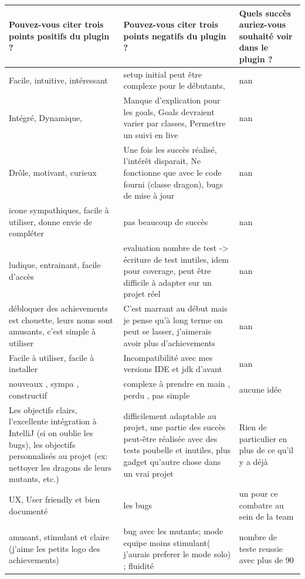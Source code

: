 \begin{center}
	\begin{longtable}{|p{5.1cm}|p{5.1cm}|p{5.1cm}|}
		\hline
		\textbf{Pouvez-vous citer trois points positifs du plugin ? } & \textbf{Pouvez-vous citer trois points negatifs du plugin ? } & \textbf{Quels succès auriez-vous souhaité voir dans le plugin ?} \\
		\hline
		Facile, intuitive, intéressant & setup initial peut être complexe pour le débutants,   & nan \\
		\hline
		Intégré, Dynamique,  & Manque d'explication pour les goals, Goals devraient varier par classes,  Permettre un suivi en live & nan \\
		\hline
		Drôle, motivant, curieux & Une fois les succès réalisé, l'intérêt disparait, Ne fonctionne que avec le code fourni (classe dragon), bugs de mise à jour & nan \\
		\hline
		icone sympathiques, facile à utiliser, donne envie de compléter & pas beaucoup de succès & nan \\
		\hline
		ludique, entrainant, facile d'accès & evaluation nombre de test -> écriture de test inutiles, idem pour coverage, peut être difficile à adapter sur un projet réel & nan \\
		\hline
		débloquer des achievements est chouette, leurs noms sont amusants, c'est simple à utiliser & C'est marrant au début mais je pense qu'à long terme on peut se lasser, j'aimerais avoir plus d'achievements & nan \\
		\hline
		Facile à utiliser, facile à installer & Incompatibilité avec mes versions IDE et jdk d'avant & nan \\
		\hline
		nouveaux , sympa , constructif  & complexe à prendre en main , perdu , pas simple  & aucune idée \\
		\hline
		Les objectifs clairs, l'excellente intégration à IntelliJ (si on oublie les bugs), les objectifs personnalisés au projet (ex: nettoyer les dragons de leurs mutants, etc.) & difficilement adaptable au projet, une partie des succès peut-être réalisée avec des tests poubelle et inutiles, plus gadget qu'autre chose dans un vrai projet & Rien de particulier en plus de ce qu'il y a déjà \\
		\hline
		UX, User friendly et bien documenté & les bugs & un pour ce combatre au sein de la team \\
		\hline
		amusant, stimulant et claire (j'aime les petits logo des achievements) & bug avec les mutants; mode equipe moins stimulant( j'aurais preferer le mode solo) ; fluidité & nombre de teste reussie avec plus de 90 %

\end{longtable}
\end{center}
